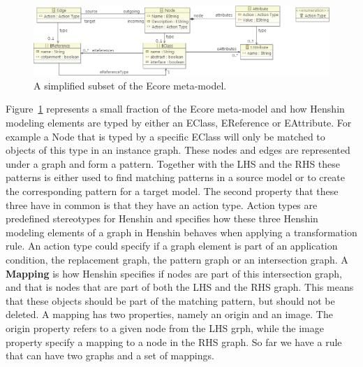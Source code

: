 \begin{figure}[H]
	\centering
	\includegraphics[scale=0.60]{./Figures/Node_edge_attribute.png}
	\caption[Henshin relationship with Ecore]
	{A simplified subset of the Ecore meta-model.}
	\label{fig:henshin_ecore}
\end{figure}

Figure~\ref{fig:henshin_ecore} represents a small fraction of the Ecore
meta-model and how Henshin modeling elements are typed by either an EClass,
EReference or EAttribute. For example a Node that is typed by a specific EClass
will only be matched to objects of this type in an instance graph. These nodes
and edges are represented under a graph and form a pattern. Together with the
LHS and the RHS these patterns is either used to find matching patterns in a
source model or to create the corresponding pattern for a target model. The
second property that these three have in common is that they have an action
type. Action types are predefined stereotypes for Henshin and specifies how
these three Henshin modeling elements of a graph in Henshin behaves when
applying a transformation rule. An action type could specify if a graph element
is part of an application condition, the replacement graph, the pattern graph
or an intersection graph. A \textbf{Mapping} is how Henshin specifies if nodes
are part of this intersection graph, and that is nodes that are part of both
the LHS and the RHS graph. This means that these objects should be part of the
matching pattern, but should not be deleted. A mapping has two properties,
namely an origin and an image. The origin property refers to a given node from
the LHS grph, while the image property specify a mapping to a node in the RHS
graph. So far we have a rule that can have two graphs and a set of mappings. 

